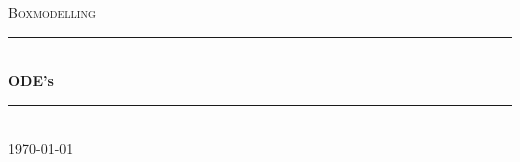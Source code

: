 \documentclass[12pt,twoside]{article}
\begin{document}
\begin{titlepage}

\newcommand{\HRule}{\rule{\linewidth}{0.5mm}} %

\center %
 

\textsc{\Large Boxmodelling}\\[0.5cm] %


\HRule \\[0.4cm]
{ \huge \bfseries ODE's}\\[-0.2cm] %
\HRule \\[0.9cm]
 




{\large \today}\\[1.5cm] %


 

\end{titlepage}
\end{document}
